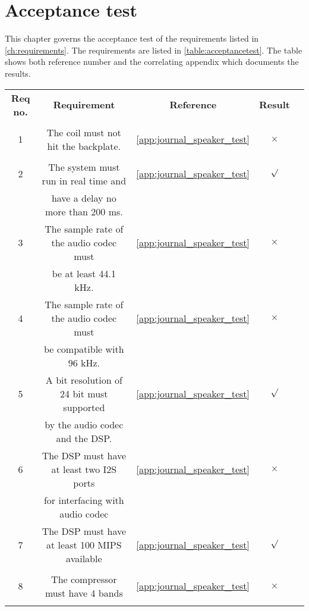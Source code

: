 \chapter{Acceptance test}

This chapter governs the acceptance test of the requirements listed in \autoref{ch:requirements}. The requirements are listed in \autoref{table:acceptancetest}. The table shows both reference number and the correlating appendix which documents the results.  

\renewcommand{\arraystretch}{0.95}
\begin{table}[H]
\centering
\begin{tabular}{|c|c|c|c|c|} \hline
\rowcolor{lightgray} \bfseries Req no. 	& \bfseries Requirement 						&  \bfseries Reference				&\bfseries Result 	\\ 
\rowcolor{lightgray}					&												&  									&		 			\\ \hline

1			& The coil must not hit the backplate. 			& \autoref{app:journal_speaker_test} 	&	$\times$ 		\\ 
 			&												& 										&	 				\\ \hline
%
2			& The system must run in real time and 			& \autoref{app:journal_speaker_test}	& 	$\surd$			\\ 
			& have a delay no more than 200 ms.				& 										&					\\ \hline
%
3			& The sample rate of the audio codec must 		& \autoref{app:journal_speaker_test}	&	$\times$		\\ 
			& be at least 44.1 kHz. 						& 										&					\\ \hline
%
4			& The sample rate of the audio codec must   	& \autoref{app:journal_speaker_test}	& 	$\times$		\\ 
			& be compatible with 96 kHz.					&										&					\\ \hline

5			&  A bit resolution of 24 bit must supported 	& \autoref{app:journal_speaker_test}	&	$\surd$			\\ 
			&  by the audio codec and the DSP. 	 	 		&						 				&					\\ \hline
%
6			& The DSP must have at least two I2S ports 		& \autoref{app:journal_speaker_test}	&	$\times$		\\ 
			& for interfacing with audio codec  			& 			 					 		&					\\ \hline
%
7			& The DSP must have at least 100 MIPS available	& \autoref{app:journal_speaker_test}	&	$\surd$			\\ 
			&										  	 	&						 				&					\\ \hline
%
8			& The compressor must have 4 bands 				& \autoref{app:journal_speaker_test}	&	$\times$		\\ 
			& 												& 			 					 		&					\\ \hline


\end{tabular}
\end{table}
